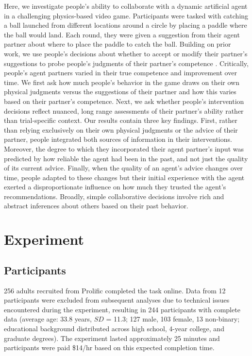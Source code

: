 \documentclass[10pt,letterpaper]{article}
\begin{document}
Here, we investigate people's ability to collaborate with a dynamic artificial agent in a challenging physics-based video game. Participants were tasked with catching a ball launched from different locations around a circle by placing a paddle where the ball would land. Each round, they were given a suggestion from their agent partner about where to place the paddle to catch the ball. Building on prior work, we use people's decisions about whether to accept or modify their partner's suggestions to probe people's judgments of their partner's competence \cite{xie2019robot, chen2020trust}. Critically, people's agent partners varied in their true competence and improvement over time. We first ask how much people's behavior in the game draws on their own physical judgments versus the suggestions of their partner and how this varies based on their partner's competence. Next, we ask whether people's intervention decisions reflect nuanced, long range assessments of their partner's ability rather than trial-specific context. Our results contain three key findings. First, rather than relying exclusively on their own physical judgments or the advice of their partner, people integrated both sources of information in their interventions. Moreover, the degree to which they incorporated their agent partner's input was predicted by how reliable the agent had been in the past, and not just the quality of its current advice. Finally, when the quality of an agent's advice changes over time, people adapted to these changes but their initial experience with the agent exerted a disproportionate influence on how much they trusted the agent's recommendations. Broadly, simple collaborative decisions involve rich and abstract inferences about others based on their past behavior.
 

\section{Experiment}

\subsection{Participants}

256 adults recruited from Prolific completed the task online. Data from 12 participants were excluded from subsequent analyses due to technical issues encountered during the experiment, resulting in 244 participants with complete data (average age: 33.8 years, $SD$ = 11.3; 127 male, 103 female, 13 non-binary; educational background distributed across high school, 4-year college, and graduate degrees). The experiment lasted approximately 25 minutes and participants were paid \$14/hr based on this expected completion time. 
\end{document}
